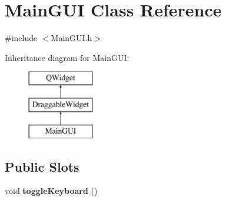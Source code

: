 \hypertarget{class_main_g_u_i}{\section{Main\+G\+U\+I Class Reference}
\label{class_main_g_u_i}
}


{\ttfamily \#include $<$Main\+G\+U\+I.\+h$>$}

Inheritance diagram for Main\+G\+U\+I\+:\begin{figure}[H]
\begin{center}
\leavevmode
\includegraphics[height=3.000000cm]{class_main_g_u_i}
\end{center}
\end{figure}
\subsection*{Public Slots}
\begin{DoxyCompactItemize}
\item 
\hypertarget{class_main_g_u_i_ac1cdc23a4db9ff808519ca15de19ac0f}{void {\bfseries toggle\+Keyboard} ()}\label{class_main_g_u_i_ac1cdc23a4db9ff808519ca15de19ac0f}

\end{DoxyCompactItemize}
